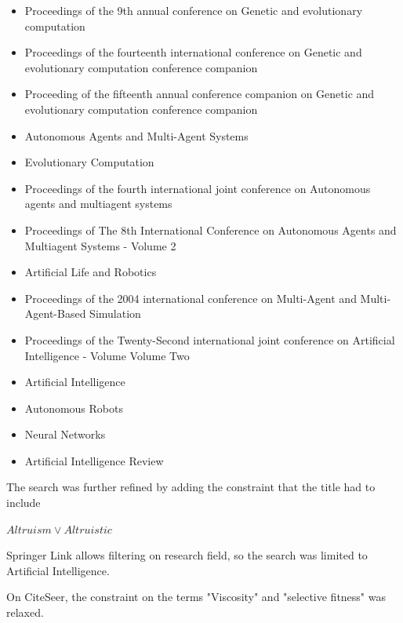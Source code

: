 \documentclass[a4paper]{book}
\begin{document}
\begin{itemize}

\item{Proceedings of the 9th annual conference on Genetic and evolutionary computation}
\item{Proceedings of the fourteenth international conference on Genetic and evolutionary computation conference companion}
\item{Proceeding of the fifteenth annual conference companion on Genetic and evolutionary computation conference companion}
\item{Autonomous Agents and Multi-Agent Systems}
\item{Evolutionary Computation}
\item{Proceedings of the fourth international joint conference on Autonomous agents and multiagent systems}
\item{Proceedings of The 8th International Conference on Autonomous Agents and Multiagent Systems - Volume 2 }
\item{Artificial Life and Robotics}
\item{Proceedings of the 2004 international conference on Multi-Agent and Multi-Agent-Based Simulation }
\item{Proceedings of the Twenty-Second international joint conference on Artificial Intelligence - Volume Volume Two}
\item{Artificial Intelligence}
\item{Autonomous Robots}
\item{Neural Networks}
\item{Artificial Intelligence Review }
\end{itemize}

The search was further refined by adding the constraint that the title had to include

$Altruism \lor Altruistic$



Springer Link allows filtering on research field, so the search was limited to Artificial Intelligence.

On CiteSeer, the constraint on the terms "Viscosity" and "selective fitness" was relaxed.
\end{document}
